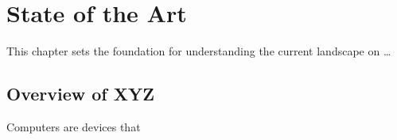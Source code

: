 \chapter{State of the Art}\label{chap:art}
This chapter sets the foundation for understanding the current landscape on \ldots

\section{Overview of XYZ}
Computers are devices that


